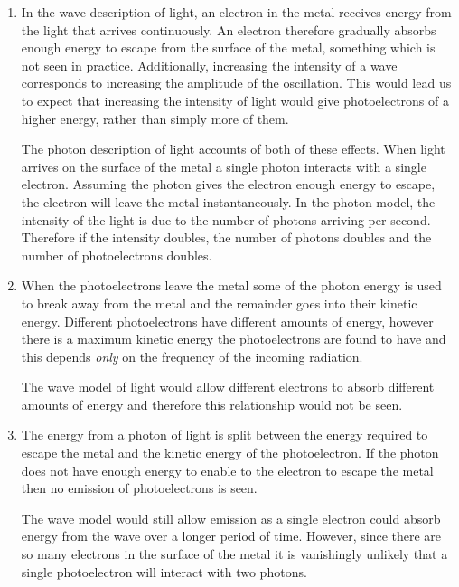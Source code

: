 \documentclass[revision-guide.tex]{subfiles}
\begin{document}
\begin{enumerate}[label=\emph{(\alph*)}]
\item In the wave description of light, an electron in the metal receives energy from the light that arrives continuously. An electron therefore gradually absorbs enough energy to escape from the surface of the metal, something which is not seen in practice. Additionally, increasing the intensity of a wave corresponds to increasing the amplitude of the oscillation. This would lead us to expect that increasing the intensity of light would give photoelectrons of a higher energy, rather than simply more of them.

The photon description of light accounts of both of these effects. When light arrives on the surface of the metal a single photon interacts with a single electron. Assuming the photon gives the electron enough energy to escape, the electron will leave the metal instantaneously. In the photon model, the intensity of the light is due to the number of photons arriving per second. Therefore if the intensity doubles, the number of photons doubles and the number of photoelectrons doubles.

\item When the photoelectrons leave the metal some of the photon energy is used to break away from the metal and the remainder goes into their kinetic energy. Different photoelectrons have different amounts of energy, however there is a maximum kinetic energy the photoelectrons are found to have and this depends \emph{only} on the frequency of the incoming radiation.

The wave model of light would allow different electrons to absorb different amounts of energy and therefore this relationship would not be seen.

\item The energy from a photon of light is split between the energy required to escape the metal and the kinetic energy of the photoelectron. If the photon does not have enough energy to enable to the electron to escape the metal then no emission of photoelectrons is seen.

The wave model would still allow emission as a single electron could absorb energy from the wave over a longer period of time. However, since there are so many electrons in the surface of the metal it is vanishingly unlikely that a single photoelectron will interact with two photons.

\end{enumerate}
\end{document}
